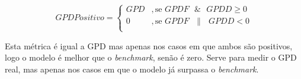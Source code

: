 \begin{equation} \label{eq:gpdpositivo} 
    GPD Positivo = 
    \begin{cases} 
        GPD & , \text{se } GPDF \text{ }\&\text{ } GPDD \geq 0 \\
        0 & , \text{se } GPDF \text{ }\|\text{ } GPDD < 0 \\
    \end{cases} 
\end{equation}
\smallskip


Esta métrica é igual a GPD mas apenas nos casos em que ambos são positivos, logo o modelo é melhor que o \textit{benchmark}, senão é zero. Serve para medir o GPD real, mas apenas nos casos em que o modelo já surpassa o \textit{benchmark}.\par
